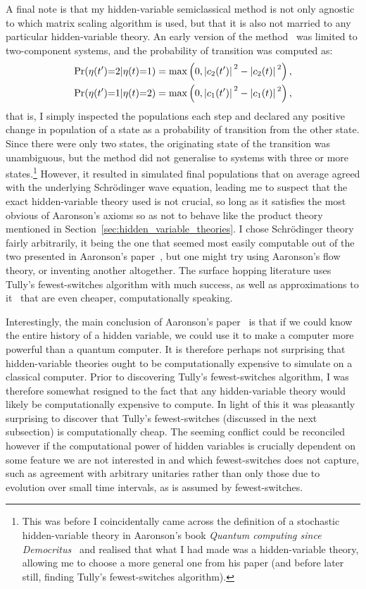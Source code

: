 A final note is that my hidden-variable semiclassical method is not only agnostic to which matrix scaling algorithm is used, but that it is also not married to any particular hidden-variable theory. An early version of the method~\cite{billington_monte_2015} was limited to two-component systems, and the probability of transition was computed as:
\begin{align} 
\Pr(\eta(t^\prime){=}2|\eta(t){=}1) &=
\max\left(0, \abs{c_2(t^\prime)}^2 - \abs{c_2(t)}^2\right),\\
\Pr(\eta(t^\prime){=}1|\eta(t){=}2) &= 
\max\left(0, \abs{c_1(t^\prime)}^2 - \abs{c_1(t)}^2\right),
\end{align}
that is, I simply inspected the populations each step and declared any positive change in population of a state as a probability of transition from the other state. Since there were only two states, the originating state of the transition was unambiguous, but the method did not generalise to systems with three or more states.\footnote{This was before I coincidentally came across the definition of a stochastic hidden-variable theory in Aaronson's book \emph{Quantum computing since Democritus}~\cite{aaronson_quantum_2013} and realised that what I had made was a hidden-variable theory, allowing me to choose a more general one from his paper (and before later still, finding Tully's fewest-switches algorithm).} However, it resulted in simulated final populations that on average agreed with the underlying Schr\"odinger wave equation, leading me to suspect that the exact hidden-variable theory used is not crucial, so long as it satisfies the most obvious of Aaronson's axioms so as not to behave like the product theory mentioned in Section~\ref{sec:hidden_variable_theories}. I chose Schr\"odinger theory fairly arbitrarily, it being the one that seemed most easily computable out of the two presented in Aaronson's paper~\cite{PhysRevA.71.032325}, but one might try using Aaronson's flow theory, or inventing another altogether. The surface hopping literature uses Tully's fewest-switches algorithm with much success, as well as approximations to it~\cite{FABIANO2008111} that are even cheaper, computationally speaking.

Interestingly, the main conclusion of Aaronson's paper~\cite{PhysRevA.71.032325} is that if we could know the entire history of a hidden variable, we could use it to make a computer more powerful than a quantum computer. It is therefore perhaps not surprising that hidden-variable theories ought to be computationally expensive to simulate on a classical computer. Prior to discovering Tully's fewest-switches algorithm, I was therefore somewhat resigned to the fact that any hidden-variable theory would likely be computationally expensive to compute. In light of this it was pleasantly surprising to discover that Tully's fewest-switches (discussed in the next subsection) is computationally cheap. The seeming conflict could be reconciled however if the computational power of hidden variables is crucially dependent on some feature we are not interested in and which fewest-switches does not capture, such as agreement with arbitrary unitaries rather than only those due to evolution over small time intervals, as is assumed by fewest-switches.


